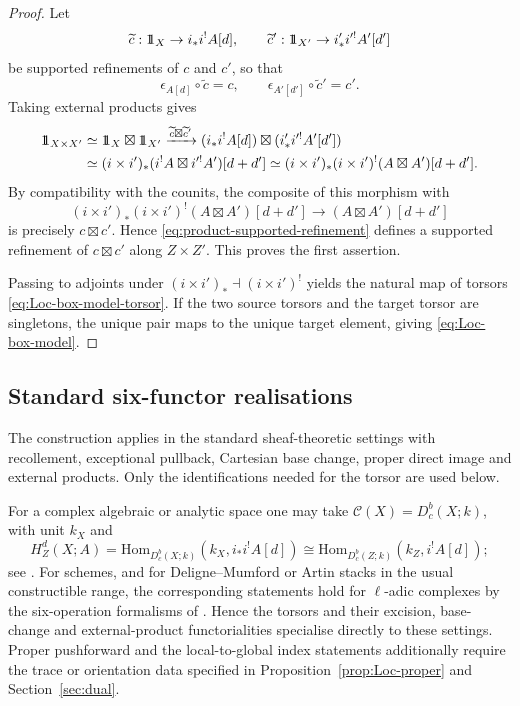\documentclass[10pt,a4paper,dvipsnames,x11names]{amsart}
\newcommand{\one}{1\hskip-3.5pt1}
\newcommand{\C}{\mathcal C}
\newcommand{\Hom}{\mathrm{Hom}}
\numberwithin{equation}{section}
\theoremstyle{plain}
\theoremstyle{definition}
\theoremstyle{remark}
\begin{document}
\begin{proof}
Let
$$
\widetilde c:\one_X\to i_*i^!A[d],
\qquad
\widetilde c':\one_{X'}\to i'_*i'^!A'[d']
$$
be supported refinements of $c$ and $c'$, so that
$$
\epsilon_{A[d]}\circ \widetilde c=c,
\qquad
\epsilon_{A'[d']}\circ \widetilde c'=c'.
$$
Taking external products gives
\begin{align*}
\one_{X\times X'}
&\simeq \one_X\boxtimes \one_{X'}
\xrightarrow{\widetilde c\boxtimes \widetilde c'}
(i_*i^!A[d])\boxtimes (i'_*i'^!A'[d']) \\
&\simeq (i\times i')_*(i^!A\boxtimes i'^!A')[d+d']
\simeq (i\times i')_*(i\times i')^!(A\boxtimes A')[d+d'].
\end{align*}
By compatibility with the counits, the composite of this morphism with
$$
(i\times i')_*(i\times i')^!(A\boxtimes A')[d+d']\longrightarrow (A\boxtimes A')[d+d']
$$
is precisely $c\boxtimes c'$. Hence \eqref{eq:product-supported-refinement} defines a supported refinement of $c\boxtimes c'$ along $Z\times Z'$. This proves the first assertion.

Passing to adjoints under $(i\times i')_*\dashv (i\times i')^!$ yields the natural map of torsors \eqref{eq:Loc-box-model-torsor}. If the two source torsors and the target torsor are singletons, the unique pair maps to the unique target element, giving \eqref{eq:Loc-box-model}.
\end{proof}



\subsection{Standard six-functor realisations}

The construction applies in the standard sheaf-theoretic settings with recollement, exceptional pullback, Cartesian base change, proper direct image and external products. Only the identifications needed for the torsor are used below.

For a complex algebraic or analytic space one may take $\C(X)=D^b_c(X;k)$, with unit $k_X$ and
\[
H_Z^d(X;A)=\Hom_{D^b_c(X;k)}(k_X,i_*i^!A[d])
\cong
\Hom_{D^b_c(Z;k)}(k_Z,i^!A[d]);
\]
see \cite{KS,BBD}. For schemes, and for Deligne--Mumford or Artin stacks in the usual constructible range, the corresponding statements hold for $\ell$-adic complexes by the six-operation formalisms of \cite{SGA4,BBD,LO1,LO2}. Hence the torsors and their excision, base-change and external-product functorialities specialise directly to these settings.  Proper pushforward and the local-to-global index statements additionally require the trace or orientation data specified in Proposition~\ref{prop:Loc-proper} and Section~\ref{sec:dual}.
\end{document}
